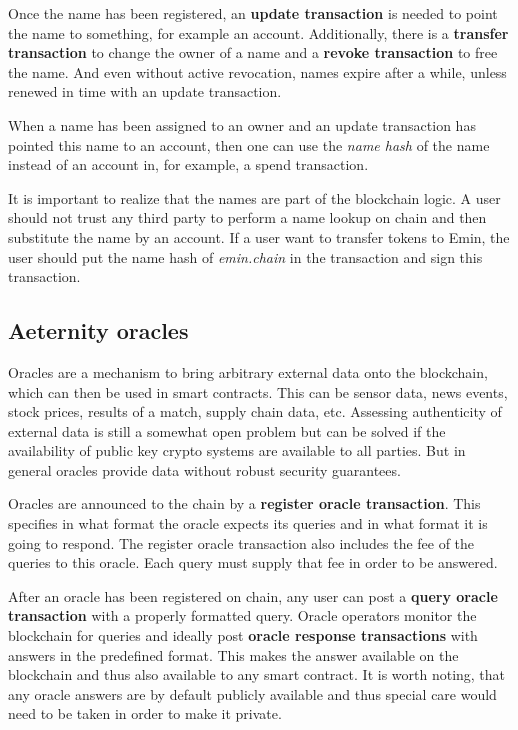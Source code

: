 Once the name has been registered, an \textbf{update transaction} is needed to
point the name to something, for example an account. Additionally, there is
a \textbf{transfer transaction} to change the owner of a name and a
\textbf{revoke transaction} to free the name.
And even without active revocation, names expire after a while, unless renewed
in time with an update transaction.

When a name has been assigned to an owner and an update transaction has pointed
this name to an account, then one can use the \textit{name hash} of the name
instead of an account in, for example, a spend transaction.

It is important to realize that the names are part of the blockchain
logic. A user should not trust any third party to perform a name lookup on
chain and then substitute the name by an account. If a user want to
transfer tokens to Emin, the user should put the name hash of
\textit{emin.chain} in the transaction and sign this transaction.

\subsection{Aeternity oracles}
\label{sect:aeoracle}

Oracles are a mechanism to bring arbitrary external data onto the blockchain,
which can then be used in smart contracts. This can be sensor data, news
events, stock prices, results of a match, supply chain data, etc.
Assessing authenticity of external data
\cite{zhang2016town,guarnizo2019pdfs, adler2018astraea} is still a somewhat
open problem but can be solved if the availability of public key crypto
systems are available to all parties. But in general oracles provide data
without robust security guarantees.

Oracles are announced to the chain by a \textbf{register oracle transaction}.
This specifies in what format the oracle expects its queries and in what format
it is going to respond. The register oracle transaction also includes the fee
of the queries to this oracle. Each query must supply that fee in order to be
answered.

After an oracle has been registered on chain, any user can post a \textbf{query
oracle transaction} with a properly formatted query.
Oracle operators monitor the blockchain for queries and ideally post
\textbf{oracle response transactions} with answers in the predefined format.
This makes the answer available on the blockchain and thus also available to
any smart contract.
It is worth noting, that any oracle answers are by default publicly available
and thus special care would need to be taken in order to make it private.

